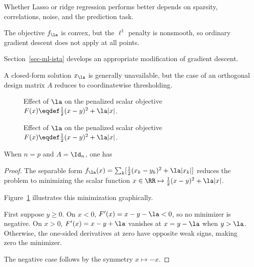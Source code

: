 Whether Lasso or ridge regression performs better depends on sparsity, correlations, noise, and the prediction task.

The objective $f_\la$ is convex, but the $\ell^1$ penalty is nonsmooth, so ordinary gradient descent does not apply at all points.
 
Section~\ref{sec-ml-ista} develops an appropriate modification of gradient descent.
 
A closed-form solution $x_\la$ is generally unavailable, but the case of an orthogonal design matrix $A$ reduces to coordinatewise thresholding.



\begin{figure}[tbp]
\centering
{}\hfill
{}
\caption{Effect of $\la$ on the penalized scalar objective $F(x)\eqdef\frac12(x-y)^2+\la|x|$.}
\label{fig-ml-varspars}
\end{figure}
\begin{figure}[tbp]
\BookContinuedFigure
\centering
{}\hfill
{}
\caption{Effect of $\la$ on the penalized scalar objective $F(x)\eqdef\frac12(x-y)^2+\la|x|$.}
\label{fig-ml-varspars-continued}
\end{figure}


\begin{prop}\label{prop-soft-tresdh}
	When $n=p$ and $A=\Id_n$, one has
\end{prop}
\begin{proof}
	The separable form $f_\la(x)=\sum_k[\frac12(x_k-y_k)^2+\la|x_k|]$ reduces the problem to minimizing the scalar
	function $x \in \RR \mapsto \frac{1}{2}(x-y)^2 + \la |x|$. 
	 
	Figure~\ref{fig-ml-varspars} illustrates this minimization graphically.
	  
	First suppose $y\geq0$. On $x<0$, $F'(x)=x-y-\la<0$, so no minimizer is negative. On $x>0$, $F'(x)=x-y+\la$ vanishes at $x=y-\la$ when $y>\la$. Otherwise, the one-sided derivatives at zero have opposite weak signs, making zero the minimizer.
	 
	The negative case follows by the symmetry $x \mapsto -x$.
\end{proof}

